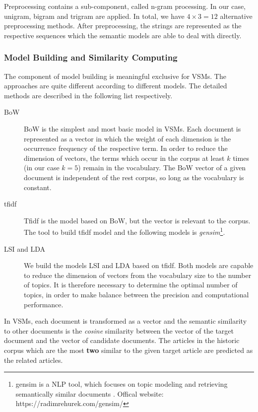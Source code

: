 Preprocessing contains a sub-component, called n-gram processing. In our case, unigram, bigram and trigram are applied. In total, we have $4 \times 3 = 12$ alternative preprocessing methods. After preprocessing, the strings are represented as the respective sequences which the semantic models are able to deal with directly. 

\subsubsection{Model Building and Similarity Computing}
The component of model building is meaningful exclusive for VSMs. The approaches are quite different according to different models.  The detailed methods are described in the following list respectively.

\begin{description}
\item[BoW] BoW is the simplest and most basic model in VSMs. Each document is represented as a vector in which the weight of each dimension is the occurrence frequency of the respective term. In order to reduce the dimension of vectors, the terms which occur in the corpus at least $k$ times (in our case $k=5$) remain in the vocabulary. The BoW vector of a given document is independent of the rest corpus, so long as the vocabulary is constant. 
\item[tfidf] Tfidf is the model based on BoW, but the vector is relevant to the corpus. The tool to build tfidf model and the following models is \textit{gensim}\footnote{gensim is a NLP tool, which focuses on topic modeling and retrieving semantically similar documents \cite{rehurek_lrec}. Offical website:  https://radimrehurek.com/gensim/}.
\item[LSI and LDA] We build the models LSI and LDA based on tfidf. Both models are capable to reduce the dimension of vectors from the vocabulary size to the number of topics. It is therefore necessary to determine the optimal number of topics, in order to make balance between the precision and computational performance. 
\end{description}

In VSMs, each document is transformed as a vector and the semantic similarity to other documents is the \textit{cosine} similarity between the vector of the target document and the vector of candidate documents. The articles in the historic corpus which are the most \textbf{two} similar to the given target article are predicted as the related articles. 


